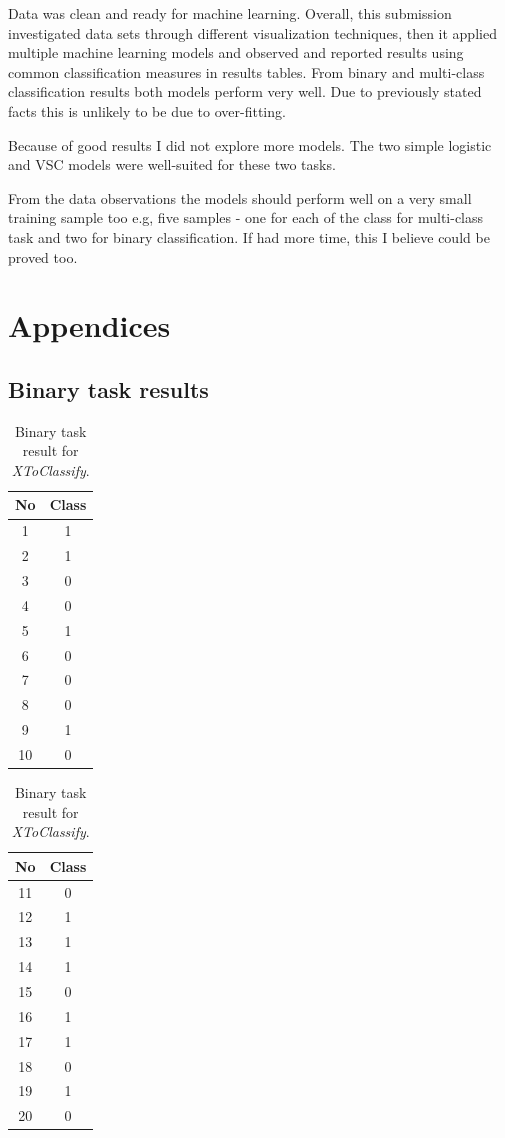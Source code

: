 \documentclass[11pt]{article}
\begin{document}
		Data was clean and ready for machine learning. Overall, this submission investigated data sets through different visualization techniques, then it applied multiple machine learning models and observed and reported results using common classification measures in results tables. From binary and multi-class classification results both models perform very well. Due to previously stated facts this is unlikely to be due to over-fitting. 

		Because of good results I did not explore more models. The two simple logistic and VSC models were well-suited for these two tasks. 

		From the data observations the models should perform well on a very small training sample too e.g, five samples - one for each of the class for multi-class task and two for binary classification. If had more time, this I believe could be proved too. 
	\clearpage
	\appendix
	\section{Appendices}
		\subsection{Binary task results}
		\begin{center}
		  	\begin{table}[h]
		  		\small

		  	\centering

			\begin{tabular}[b]{| c | c|} 
				\hline
				No & Class \\
				\hline
				1 & 1 \\ 2 & 1 \\ 3 & 0 \\ 4 & 0 \\ 5 & 1 \\ 6 & 0 \\ 7 & 0 \\ 8 & 0 \\ 9 & 1 \\ 10 & 0 \\
				\hline
			\end{tabular}
			\begin{tabular}[b]{| c | c|} 
				\hline
				No & Class \\
				\hline
				11 & 0 \\ 12 & 1 \\ 13 & 1 \\ 14 & 1 \\ 15 & 0 \\ 16 & 1 \\ 17 & 1 \\ 18 & 0 \\ 19 & 1 \\ 20 & 0 \\
				\hline
			\end{tabular}
			\caption{Binary task result for \textit{XToClassify}.}
			\label{tbl:final_binary}
			\end{table}
		\end{center}
\end{document}
